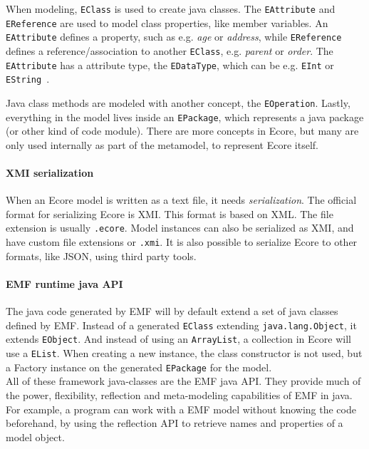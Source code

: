 When modeling, \texttt{EClass} is used to create java classes.
The \texttt{EAttribute} and \texttt{EReference} are used to model class properties, like member variables.
An \texttt{EAttribute} defines a property, such as e.g. \textit{age} or \textit{address}, while \texttt{EReference} defines a reference/association to another \texttt{EClass}, e.g. \textit{parent} or \textit{order}.
The \texttt{EAttribute} has a attribute type, the \texttt{EDataType}, which can be e.g. \texttt{EInt} or \texttt{EString}~\cite{edmerksEMFEclipseModeling2009}.

Java class methods are modeled with another concept, the \texttt{EOperation}.
Lastly, everything in the model lives inside an \texttt{EPackage}, which represents a java package (or other kind of code module).
There are more concepts in \gls{Ecore}, but many are only used internally as part of the metamodel, to represent \gls{Ecore} itself.


\paragraph{\Acrshort{XMI} serialization}
When an \gls{Ecore} model is written as a text file, it needs \textit{serialization}.
The official format for serializing Ecore is \acrfull{XMI}.
This format is based on \acrfull{XML}.
The file extension is usually \texttt{.ecore}.
Model instances can also be serialized as \acrshort{XMI}, and have custom file extensions or \texttt{.xmi}.
It is also possible to serialize \gls{Ecore} to other formats, like \gls{JSON}, using third party tools.

\paragraph{\acrshort{EMF} runtime java \acrshort{API}}
The java code generated by \acrshort{EMF} will by default extend a set of java classes defined by \acrshort{EMF}.
Instead of a generated \texttt{EClass} extending \texttt{java.lang.Object}, it extends \texttt{EObject}.
And instead of using an \texttt{ArrayList}, a collection in \gls{Ecore} will use a \texttt{EList}.
When creating a new instance, the class constructor is not used, but a Factory instance on the generated \texttt{EPackage} for the model.\\

All of these framework java-classes are the \acrshort{EMF} java \gls{API}.
They provide much of the power, flexibility, reflection and meta-modeling capabilities of \acrshort{EMF} in java.
For example, a program can work with a \acrshort{EMF} model without knowing the code beforehand, by using the reflection \acrshort{API} to retrieve names and properties of a model object.\\

